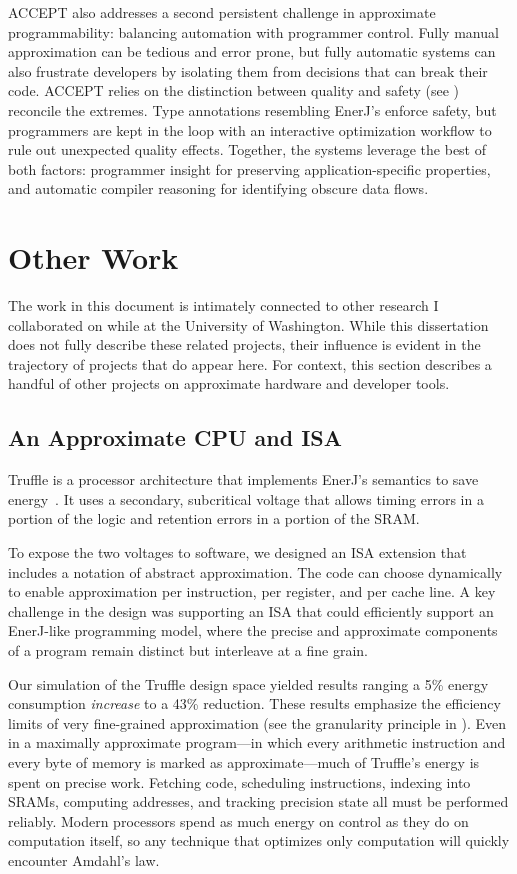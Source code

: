 ACCEPT also addresses a second persistent challenge in approximate
programmability:
balancing automation with programmer control.
Fully manual approximation can be tedious and error prone,
but fully automatic systems can also frustrate developers by isolating them
from decisions that can break their code.
ACCEPT relies on the distinction between quality and safety (see
) reconcile the extremes.
Type annotations resembling EnerJ's enforce safety, but programmers are kept
in the loop with an interactive optimization workflow to rule out unexpected
quality effects.
Together, the systems leverage the best of both factors:
programmer insight for preserving application-specific properties,
and automatic compiler reasoning for identifying obscure data flows.

\section{Other Work}

The work in this document is intimately connected to other research I
collaborated on while at the University of Washington.
While this dissertation does not fully describe these related projects, their
influence is evident in the trajectory of projects that do appear here.
For context, this section describes a handful of other projects on approximate
hardware and developer tools.


\subsection{An Approximate CPU and ISA}

Truffle is a processor architecture that implements EnerJ's semantics to save
energy~\cite{truffle}. It uses a secondary, subcritical voltage that allows timing errors in
a portion of the logic and retention errors in a portion of the SRAM.

To expose the two voltages to software, we
designed an ISA extension that includes a notation of abstract approximation.
The code can choose dynamically to enable approximation
per instruction, per register, and per cache line.
A key challenge in the design was supporting an ISA that could efficiently
support an EnerJ-like programming model, where the precise and approximate
components of a program remain distinct but interleave at a fine grain.

Our simulation of the Truffle design space yielded results ranging a 5\%
energy consumption \emph{increase} to a 43\% reduction.
These results emphasize the efficiency limits of very fine-grained
approximation (see the granularity principle in ).
Even in a maximally approximate program---in which every
arithmetic instruction and every byte of memory is marked as
approximate---much of Truffle's energy is spent on precise work. Fetching
code, scheduling instructions, indexing into SRAMs, computing addresses, and
tracking precision state all must be performed reliably.
Modern processors spend as much energy on
control as they do on computation itself, so any technique that optimizes only
computation will quickly encounter Amdahl's law.

